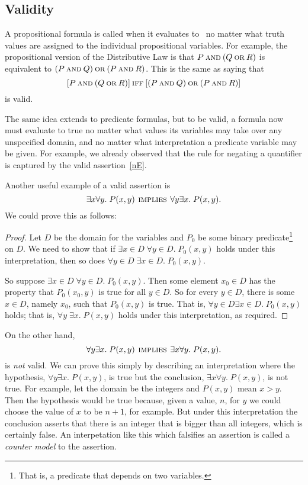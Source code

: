 \iffalse Logicians have worked very hard to define strict rules for the
use of logic notation so that ideas can be expressed with absolute rigor.
It's all quite charming and clever.  However, the sad irony is that
applied mathematicans usually use their beloved notation as a crude
shorthand, breaking the rules and abusing the notation willy-nilly ---sort
of like pounding nails with fine china.  \fi

\subsection{Validity}

A propositional formula is called  when it evaluates to \true\
no matter what truth values are assigned to the individual propositional
variables.  For example, the propositional version of the Distributive Law
is that $P \mathbin{\mathrm{\textsc{and}}} (Q \mathbin{\mathrm{\textsc{or}}} R)$ is equivalent to $(P \mathbin{\mathrm{\textsc{and}}} Q) \mathbin{\mathrm{\textsc{or}}} (P \mathbin{\mathrm{\textsc{and}}}
R)$.  This is the same as saying that
\[
[P \mathbin{\mathrm{\textsc{and}}} (Q \mathbin{\mathrm{\textsc{or}}} R)] \mathbin{\mathrm{\textsc{iff}}} [(P \mathbin{\mathrm{\textsc{and}}} Q) \mathbin{\mathrm{\textsc{or}}} (P \mathbin{\mathrm{\textsc{and}}} R)]
\]
is valid.

The same idea extends to predicate formulas, but to be valid, a
formula now must evaluate to true no matter what values its variables
may take over any unspecified domain, and no matter what
interpretation a predicate variable may be given.  For example, we
already observed that the rule for negating a quantifier is captured
by the valid assertion~\eqref{nE}.

Another useful example of a valid assertion is
\[
\exists x \forall y.\; P(x,y) \mathbin{\mathrm{\textsc{\,implies\,}}} \forall y \exists x.\; P(x,y).
\]
We could prove this as follows:
\begin{proof}
Let $D$ be the domain for the variables and $P_0$ be some
binary predicate\footnote{That is, a predicate that depends on two variables.}
on $D$.  We need to show that if $\exists x \in D\; \forall y \in D.\;
P_0(x,y)$ holds under this interpretation, then so does $\forall y \in D\;
\exists x \in D.\; P_0(x,y)$.

So suppose $\exists x \in D\; \forall y \in D.\; P_0(x,y)$.  Then some
element $x_0 \in D$ has the property that $P_0(x_0, y)$ is true for all $y
\in D$.  So for every $y \in D$, there is some $x \in D$, namely $x_0$,
such that $P_0(x,y)$ is true.  That is, $\forall y \in D\exists x \in D.\;
P_0(x,y)$ holds; that is, $\forall y\; \exists x.\; P(x,y)$ holds under this
interpretation, as required.
\end{proof}

On the other hand,
\[
\forall y \exists x.\; P(x,y) \mathbin{\mathrm{\textsc{\,implies\,}}} \exists x \forall y.\; P(x,y).
\]
is \emph{not} valid.  We can prove this simply by describing an
interpretation where the hypothesis, $\forall y \exists x.\; P(x,y)$, is
true but the conclusion, $\exists x \forall y.\; P(x,y)$, is not true.
For example, let the domain be the integers and $P(x,y)$ mean $x > y$.
Then the hypothesis would be true because, given a value, $n$, for $y$ we
could choose the value of $x$ to be $n+1$, for example.  But under this
interpretation the conclusion asserts that there is an integer that is
bigger than all integers, which is certainly false.  An interpetation like
this which falsifies an assertion is called a \emph{counter model} to the
assertion.

